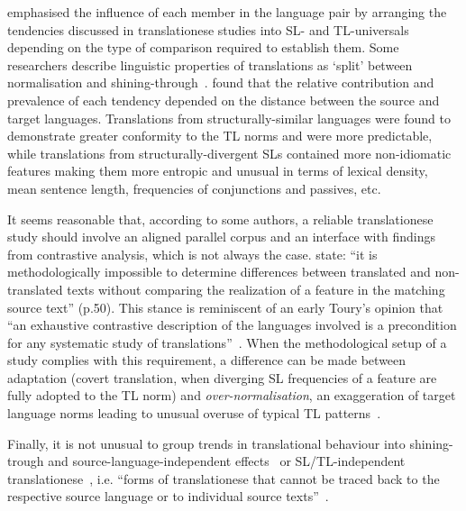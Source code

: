 \citet{Chesterman2004} emphasised the influence of each member in the language pair by arranging the tendencies discussed in translationese studies into SL- and TL-universals depending on the type of comparison required to establish them. Some researchers describe linguistic properties of translations as `split' between normalisation and shining-through~\cite{HansenSchirra2011}. \citet{Nikolaev2020} found that the relative contribution and prevalence of each tendency depended on the distance between the source and target languages. Translations from structurally-similar languages were found to demonstrate greater conformity to the TL norms and were more predictable, while translations from structurally-divergent SLs contained more non-idiomatic features making them more entropic and unusual in terms of  lexical density, mean sentence length, frequencies of conjunctions and passives, etc. 

It seems reasonable that, according to some authors, a reliable translationese study should involve an aligned parallel corpus and an interface with findings from contrastive analysis, which is not always the case. \citet{Evert2017} state: ``it is methodologically impossible to determine differences between translated and non-translated texts without comparing the realization of a feature in the matching source text'' (p.50). This stance is reminiscent of an early Toury's opinion that ``an exhaustive contrastive description of the languages involved is a precondition for any systematic study of translations''~\cite[p.29]{Toury1980}. When the methodological setup of a study complies with this requirement, a difference can be made between adaptation (covert translation, when diverging SL frequencies of a feature are fully adopted to the TL norm) and \textit{over-normalisation}, an exaggeration of target language norms leading to unusual overuse of typical TL patterns~\cite{Evert2017}. 

Finally, it is not unusual to group trends in translational behaviour into shining-trough and source-language-independent effects~\cite{Koppel2011} or SL/TL-independent translationese~\cite{Kunilovskaya2020vars,Kunilovskaya2021regs}, i.e. ``forms of translationese that cannot be traced back to the respective source language or to individual source texts''~\cite[p.54]{Evert2017}.

